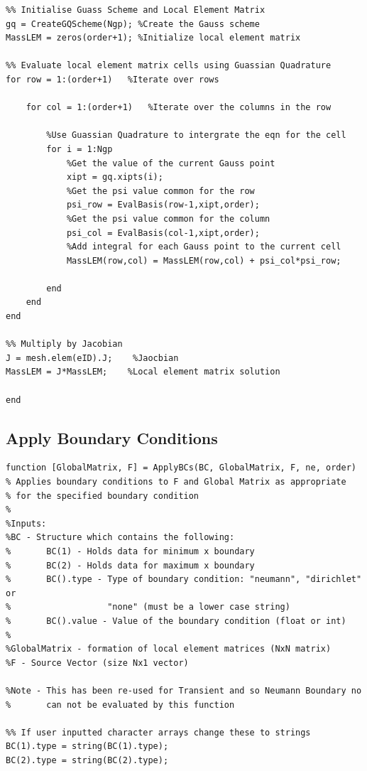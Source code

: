 \documentclass[11pt]{article}
\begin{document}
\begin{appendices}
\begin{lstlisting}
%% Initialise Guass Scheme and Local Element Matrix
gq = CreateGQScheme(Ngp); %Create the Gauss scheme
MassLEM = zeros(order+1); %Initialize local element matrix

%% Evaluate local element matrix cells using Guassian Quadrature
for row = 1:(order+1)   %Iterate over rows
    
    for col = 1:(order+1)   %Iterate over the columns in the row
        
        %Use Guassian Quadrature to intergrate the eqn for the cell
        for i = 1:Ngp
            %Get the value of the current Gauss point
            xipt = gq.xipts(i);
            %Get the psi value common for the row
            psi_row = EvalBasis(row-1,xipt,order);
            %Get the psi value common for the column
            psi_col = EvalBasis(col-1,xipt,order);
            %Add integral for each Gauss point to the current cell
            MassLEM(row,col) = MassLEM(row,col) + psi_col*psi_row;
            
        end
    end
end

%% Multiply by Jacobian
J = mesh.elem(eID).J;    %Jaocbian
MassLEM = J*MassLEM;    %Local element matrix solution

end
\end{lstlisting}

\pagebreak
\subsection{Apply Boundary Conditions}\label{ap:ApplyBC}

\begin{lstlisting}
function [GlobalMatrix, F] = ApplyBCs(BC, GlobalMatrix, F, ne, order)
% Applies boundary conditions to F and Global Matrix as appropriate
% for the specified boundary condition
%
%Inputs:
%BC - Structure which contains the following:
%       BC(1) - Holds data for minimum x boundary
%       BC(2) - Holds data for maximum x boundary
%       BC().type - Type of boundary condition: "neumann", "dirichlet" or
%                   "none" (must be a lower case string)
%       BC().value - Value of the boundary condition (float or int)
%
%GlobalMatrix - formation of local element matrices (NxN matrix)
%F - Source Vector (size Nx1 vector)

%Note - This has been re-used for Transient and so Neumann Boundary no
%       can not be evaluated by this function

%% If user inputted character arrays change these to strings
BC(1).type = string(BC(1).type);
BC(2).type = string(BC(2).type);


\end{lstlisting}
\end{appendices}
\end{document}
